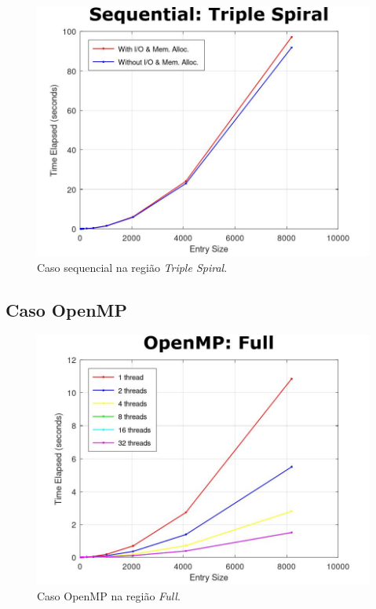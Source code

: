 \documentclass[a4paper, 12pt]{article}
\begin{document}
\begin{figure}[H]
	\centering
	\includegraphics[scale=0.45]{seq_triple_spiral}
	\caption{Caso sequencial na região \textit{Triple Spiral}.}
\end{figure}

\subsection{Caso OpenMP}

\begin{figure}[H]
	\centering
	\includegraphics[scale=0.45]{omp_full}
	\caption{Caso OpenMP na região \textit{Full}.}
\end{figure}
\end{document}
